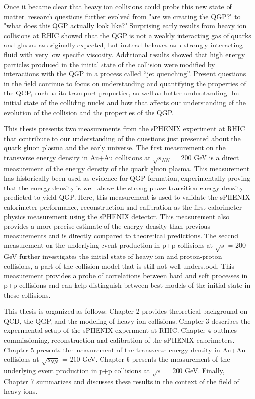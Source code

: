 Once it became clear that heavy ion collisions could probe this new state of matter, research questions further evolved from "are we creating the QGP?" to "what does this QGP actually look like?"
Surprising early results from heavy ion collisions at RHIC showed that the QGP is not a weakly interacting gas of quarks and gluons as originally expected, but instead behaves as a strongly interacting fluid with very low specific viscosity.
Additional results showed that high energy particles produced in the initial state of the collision were modified by interactions with the QGP in a process called “jet quenching”. 
Present questions in the field continue to focus on understanding and quantifying the properties of the QGP, such as its transport properties, as well as better understanding the initial state of the colliding nuclei and how that affects our understanding of the evolution of the collision and the properties of the QGP.

This thesis presents two measurements from the sPHENIX experiment at RHIC that contribute to our understanding of the questions just presented about the quark gluon plasma and the early universe. The first measurement on the transverse energy density in Au+Au collisions at $\sqrt{s_{NN}}$ = 200 GeV is a direct measurement of the energy density of the quark gluon plasma. This measurement has historically been used as evidence for QGP formation, experimentally proving that the energy density is well above the strong phase transition energy density predicted to yield QGP. Here, this measurement is used to validate the sPHENIX calorimeter performance, reconstruction and calibration as the first calorimeter physics measurement using the sPHENIX detector. This measurement also provides a more precise estimate of the energy density than previous measurements and is directly compared to theoretical predictions. 
The second measurement on the underlying event production in p+p collisions at $\sqrt{s}$ = 200 GeV further investigates the initial state of heavy ion and proton-proton collisions, a part of the collision model that is still not well understood. This measurement provides a probe of correlations between hard and soft processes in p+p collisions and can help distinguish between best models of the initial state in these collisions.

This thesis is organized as follows: Chapter 2 provides theoretical background on QCD, the QGP, and the modeling of heavy ion collisions. Chapter 3 describes the experimental setup of the sPHENIX experiment at RHIC. Chapter 4 outlines commissioning, reconstruction and calibration of the sPHENIX calorimeters. Chapter 5 presents the measurement of the transverse energy density in Au+Au collisions at $\sqrt{s_{NN}}$ = 200 GeV. Chapter 6 presents the measurement of the underlying event production in p+p collisions at $\sqrt{s}$ = 200 GeV. Finally, Chapter 7 summarizes and discusses these results in the context of the field of heavy ions.